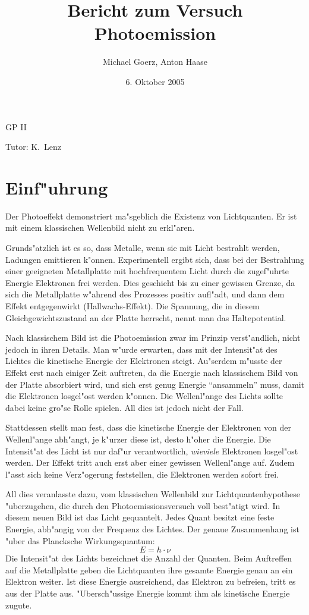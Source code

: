 \documentclass[a4paper,10pt]{article}
\title{Bericht zum Versuch Photoemission}
\author{Michael Goerz, Anton Haase}
\date{6. Oktober 2005}
\begin{document}
\maketitle
\noindent GP II

\noindent Tutor: K.~Lenz

\section{Einf"uhrung}
  Der Photoeffekt demonstriert ma"sgeblich die Existenz von Lichtquanten. Er ist mit einem klassischen Wellenbild nicht zu erkl"aren.

  Grunds"atzlich ist es so, dass Metalle, wenn sie mit Licht bestrahlt werden, Ladungen emittieren k"onnen. Experimentell ergibt sich, dass bei der Bestrahlung einer geeigneten Metallplatte mit hochfrequentem Licht durch die zugef"uhrte Energie Elektronen frei werden. Dies geschieht bis zu einer gewissen Grenze, da sich die Metallplatte w"ahrend des Prozesses positiv auf\-l"adt, und dann dem Effekt entgegenwirkt (Hallwachs-Effekt). Die Spannung, die in diesem Gleichgewichtszustand an der Platte herrscht, nennt man das Haltepotential.

  Nach klassischem Bild ist die Photoemission zwar im Prinzip verst"andlich, nicht jedoch in ihren Details. Man w"urde erwarten, dass mit der Intensit"at des Lichtes die kinetische Energie der Elektronen steigt. Au"serdem m"usste der Effekt erst nach einiger Zeit auftreten, da die Energie nach klassischem Bild von der Platte absorbiert wird, und sich erst genug Energie ``ansammeln'' muss, damit die Elektronen losgel"ost werden k"onnen. Die Wellenl"ange des Lichts sollte dabei keine gro"se Rolle spielen. All dies ist jedoch nicht der Fall.

  Stattdessen stellt man fest, dass die kinetische Energie der Elektronen von der Wellenl"ange abh"angt, je k"urzer diese ist, desto h"oher die Energie. Die Intensit"at des Licht ist nur daf"ur verantwortlich, \emph{wieviele} Elektronen losgel"ost werden. Der Effekt tritt auch erst aber einer gewissen Wellenl"ange auf. Zudem l"asst sich keine Verz"ogerung feststellen, die Elektronen werden sofort frei.

  All dies veranlasste dazu, vom klassischen Wellenbild zur Lichtquantenhypothese "uberzugehen, die durch den Photoemissionsversuch voll best"atigt wird. In diesem neuen Bild ist das Licht gequantelt. Jedes Quant besitzt eine feste Energie, abh"angig von der Frequenz des Lichtes. Der genaue Zusammenhang ist "uber das Plancksche Wirkungsquantum:
  \begin{equation}
    E = h \cdot \nu
  \end{equation}
  Die Intensit"at des Lichts bezeichnet die Anzahl der Quanten. Beim Auftreffen auf die Metallplatte geben die Lichtquanten ihre gesamte Energie genau an ein Elektron weiter. Ist diese Energie ausreichend, das Elektron zu befreien, tritt es aus der Platte aus. "Ubersch"ussige Energie kommt ihm als kinetische Energie zugute.
\end{document}
